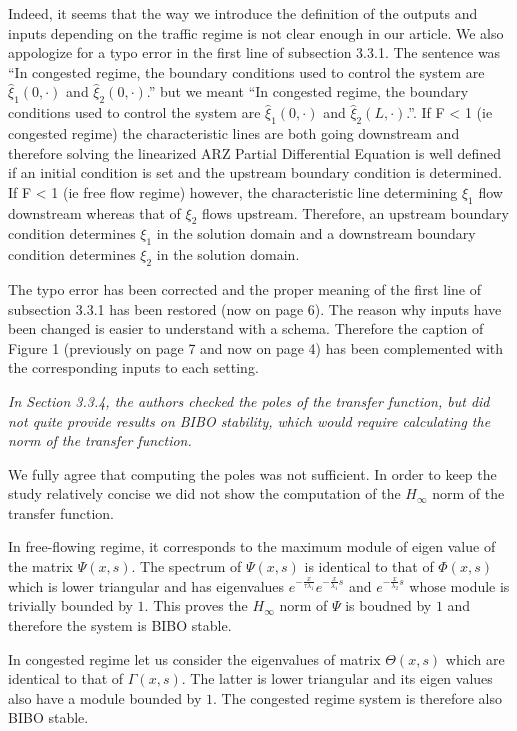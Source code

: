 \documentclass{article}
\begin{document}
Indeed, it seems that the way we introduce the definition of the outputs and inputs depending on the traffic regime is not clear enough in our article. We also appologize for a typo error in the first line of subsection 3.3.1. The sentence was ``In congested regime, the boundary conditions used to control the system are $\hat{\xi}_{1}\left(0,\cdot\right)$ and $\hat{\xi}_{2}\left(0,\cdot\right)$.'' but we meant ``In congested regime, the boundary conditions used to control the system are $\hat{\xi}_{1}\left(0,\cdot\right)$ and $\hat{\xi}_{2}\left(L,\cdot\right)$.''.
If F < 1 (ie congested regime) the characteristic lines are both going downstream and therefore solving the linearized ARZ Partial Differential Equation is well defined if an initial condition is set and the upstream boundary condition is determined.
If F < 1 (ie free flow regime) however, the characteristic line determining $\xi_1$ flow downstream whereas that of $\xi_2$ flows upstream. Therefore, an upstream boundary condition determines $\xi_1$ in the solution domain and a downstream boundary condition determines $\xi_2$ in the solution domain.

The typo error has been corrected and the proper meaning of the first line of subsection 3.3.1 has been restored (now on page 6). The reason why inputs have been changed is easier to understand with a schema. Therefore the caption of Figure 1 (previously on page 7 and now on page 4) has been complemented with the corresponding inputs to each setting.

\bigskip{}

\emph{
In Section 3.3.4, the authors checked the poles of the transfer function, but did not quite provide results on BIBO stability, which would require calculating the norm of the transfer function.
}

We fully agree that computing the poles was not sufficient. In order to keep the study relatively concise we did not show the computation of the $H_{\infty}$ norm of the transfer function. 

In free-flowing regime, it corresponds to the maximum module of eigen value of the matrix $\Psi(x,s)$. The spectrum of $\Psi(x,s)$ is identical to that of $\Phi(x,s)$ which is lower triangular and has eigenvalues 
$
e^{ - \frac{x}{\tau \lambda_1}}
e^{ - \frac{x}{\lambda_1} s}
$
and
$
e^{ - \frac{x}{\lambda_2} s}
$
whose module is trivially bounded by $1$.
This proves the $H_{\infty}$ norm of $\Psi$ is boudned by $1$ and therefore the system is BIBO stable.

In congested regime let us consider the eigenvalues of matrix $\Theta(x,s)$ which are identical to that of $\Gamma(x,s)$.
The latter is lower triangular and its eigen values also have a module bounded by $1$.
The congested regime system is therefore also BIBO stable.
\end{document}
